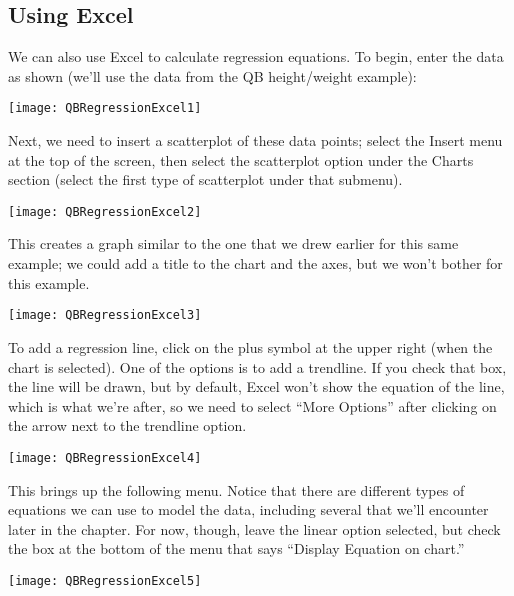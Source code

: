 \subsection{Using Excel}
We can also use Excel to calculate regression equations.  To begin, enter the data as shown (we'll use the data from the QB height/weight example):

\begin{center}
\texttt{[image: QBRegressionExcel1]}
\end{center}
\pagebreak

Next, we need to insert a scatterplot of these data points; select the Insert menu at the top of the screen, then select the scatterplot option under the Charts section (select the first type of scatterplot under that submenu).

\begin{center}
\texttt{[image: QBRegressionExcel2]}
\end{center}

This creates a graph similar to the one that we drew earlier for this same example; we could add a title to the chart and the axes, but we won't bother for this example.

\begin{center}
\texttt{[image: QBRegressionExcel3]}
\end{center}

To add a regression line, click on the plus symbol at the upper right (when the chart is selected).  One of the options is to add a trendline.  If you check that box, the line will be drawn, but by default, Excel won't show the equation of the line, which is what we're after, so we need to select ``More Options'' after clicking on the arrow next to the trendline option.

\begin{center}
\texttt{[image: QBRegressionExcel4]}
\end{center}

This brings up the following menu.  Notice that there are different types of equations we can use to model the data, including several that we'll encounter later in the chapter.  For now, though, leave the linear option selected, but check the box at the bottom of the menu that says ``Display Equation on chart.''

\begin{center}
\texttt{[image: QBRegressionExcel5]}
\end{center}


